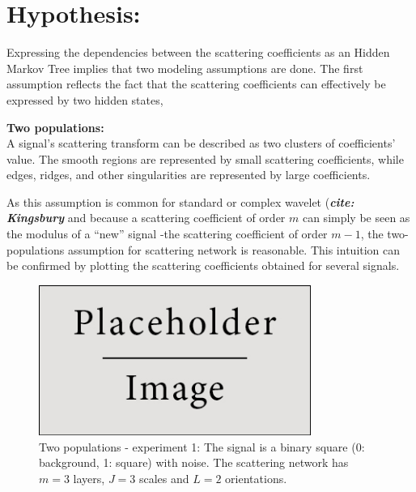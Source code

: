 \documentclass[a4paper,11pt]{report}
\begin{document}
    
  \section{Hypothesis:}
    \label{sec:SHMT/Hypos}
    
    Expressing the dependencies between the scattering coefficients as an Hidden Markov Tree implies that two modeling assumptions are done. The first assumption reflects the fact that the scattering coefficients can effectively be expressed by two hidden states,\\
    
    \begin{assumption}\textbf{Two populations:}\\
			A signal's scattering transform can be described as two clusters of coefficients' value. The smooth regions are represented by small scattering coefficients, while edges, ridges, and other singularities are represented by large coefficients.\\
			\label{assum:2pop}
    \end{assumption}
    
    As this assumption is common for standard or complex wavelet (\textbf{\textit{cite: Kingsbury}} and because a scattering coefficient of order $m$ can simply be seen as the modulus of a ``new'' signal -\ie the scattering coefficient of order $m-1$, the two-populations assumption for scattering network is reasonable. This intuition can be confirmed by plotting the scattering coefficients obtained for several signals.\\
    
		\begin{figure}
				\begin{center}
					\includegraphics[width=3.5in]{placeholder.jpg}
					\caption[Two populations - experiment 1.]{Two populations - experiment 1: The signal is a binary square (0: background, 1: square) with noise. The scattering network has $m=3$ layers, $J=3$ scales and $L=2$ orientations.} %
					\label{fig:2pop - 1}
				\end{center}
		\end{figure}    
		
\end{document}
